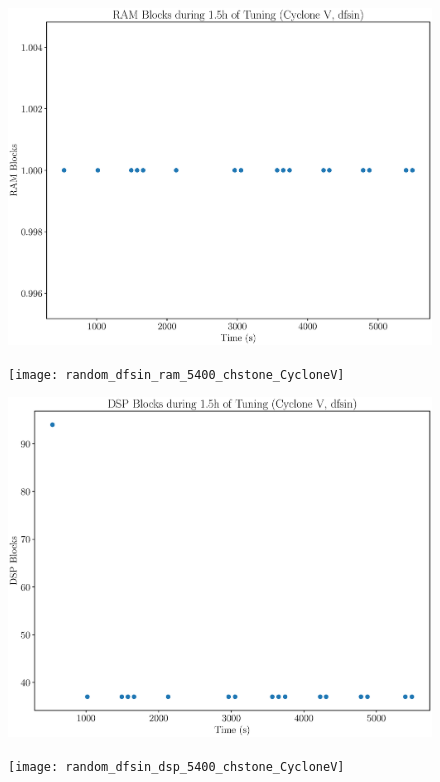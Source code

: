 \documentclass[12pt, a4paper]{article}
\begin{document}
\begin{figure}[htpb]
    \centering
    \noindent
    \begin{minipage}{.48\textwidth}
        \centering
        \includegraphics[scale=.25]{dfsin_ram_5400_chstone_CycloneV}
    \end{minipage}%
    \hfill
    \begin{minipage}{.48\textwidth}
        \centering
        \texttt{[image: random\_dfsin\_ram\_5400\_chstone\_CycloneV]}
    \end{minipage}%

    \begin{minipage}{.48\textwidth}
        \includegraphics[scale=.25]{dfsin_dsp_5400_chstone_CycloneV}
    \end{minipage}%
    \hfill
    \begin{minipage}{.48\textwidth}
        \texttt{[image: random\_dfsin\_dsp\_5400\_chstone\_CycloneV]}
    \end{minipage}%


\end{figure}
\end{document}
